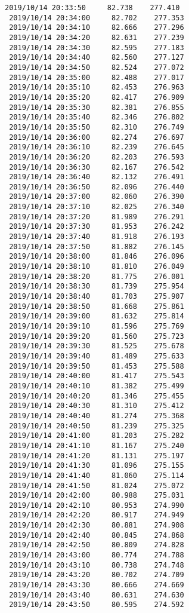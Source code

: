 \documentclass[11pt]{article}
\begin{document}
\begin{Verbatim}[commandchars=\\\{\}]
 2019/10/14 20:33:50     82.738    277.410
 2019/10/14 20:34:00     82.702    277.353
 2019/10/14 20:34:10     82.666    277.296
 2019/10/14 20:34:20     82.631    277.239
 2019/10/14 20:34:30     82.595    277.183
 2019/10/14 20:34:40     82.560    277.127
 2019/10/14 20:34:50     82.524    277.072
 2019/10/14 20:35:00     82.488    277.017
 2019/10/14 20:35:10     82.453    276.963
 2019/10/14 20:35:20     82.417    276.909
 2019/10/14 20:35:30     82.381    276.855
 2019/10/14 20:35:40     82.346    276.802
 2019/10/14 20:35:50     82.310    276.749
 2019/10/14 20:36:00     82.274    276.697
 2019/10/14 20:36:10     82.239    276.645
 2019/10/14 20:36:20     82.203    276.593
 2019/10/14 20:36:30     82.167    276.542
 2019/10/14 20:36:40     82.132    276.491
 2019/10/14 20:36:50     82.096    276.440
 2019/10/14 20:37:00     82.060    276.390
 2019/10/14 20:37:10     82.025    276.340
 2019/10/14 20:37:20     81.989    276.291
 2019/10/14 20:37:30     81.953    276.242
 2019/10/14 20:37:40     81.918    276.193
 2019/10/14 20:37:50     81.882    276.145
 2019/10/14 20:38:00     81.846    276.096
 2019/10/14 20:38:10     81.810    276.049
 2019/10/14 20:38:20     81.775    276.001
 2019/10/14 20:38:30     81.739    275.954
 2019/10/14 20:38:40     81.703    275.907
 2019/10/14 20:38:50     81.668    275.861
 2019/10/14 20:39:00     81.632    275.814
 2019/10/14 20:39:10     81.596    275.769
 2019/10/14 20:39:20     81.560    275.723
 2019/10/14 20:39:30     81.525    275.678
 2019/10/14 20:39:40     81.489    275.633
 2019/10/14 20:39:50     81.453    275.588
 2019/10/14 20:40:00     81.417    275.543
 2019/10/14 20:40:10     81.382    275.499
 2019/10/14 20:40:20     81.346    275.455
 2019/10/14 20:40:30     81.310    275.412
 2019/10/14 20:40:40     81.274    275.368
 2019/10/14 20:40:50     81.239    275.325
 2019/10/14 20:41:00     81.203    275.282
 2019/10/14 20:41:10     81.167    275.240
 2019/10/14 20:41:20     81.131    275.197
 2019/10/14 20:41:30     81.096    275.155
 2019/10/14 20:41:40     81.060    275.114
 2019/10/14 20:41:50     81.024    275.072
 2019/10/14 20:42:00     80.988    275.031
 2019/10/14 20:42:10     80.953    274.990
 2019/10/14 20:42:20     80.917    274.949
 2019/10/14 20:42:30     80.881    274.908
 2019/10/14 20:42:40     80.845    274.868
 2019/10/14 20:42:50     80.809    274.828
 2019/10/14 20:43:00     80.774    274.788
 2019/10/14 20:43:10     80.738    274.748
 2019/10/14 20:43:20     80.702    274.709
 2019/10/14 20:43:30     80.666    274.669
 2019/10/14 20:43:40     80.631    274.630
 2019/10/14 20:43:50     80.595    274.592

\end{Verbatim}
\end{document}
